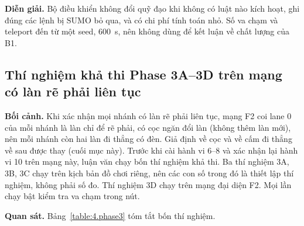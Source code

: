 \documentclass[../main.tex]{subfiles}
\begin{document}
\textbf{Diễn giải.} Bộ điều khiển không đổi quỹ đạo khi không có luật nào kích hoạt, ghi đúng các lệnh bị SUMO bỏ qua, và có chi phí tính toán nhỏ. Số va chạm và teleport đến từ một seed, 600~s, nên không dùng để kết luận về chất lượng của B1.

\subsection{Thí nghiệm khả thi Phase 3A--3D trên mạng có làn rẽ phải liên tục}
\label{subsection:phase3}

\textbf{Bối cảnh.} Khi xác nhận mọi nhánh có làn rẽ phải liên tục, mạng F2 coi lane 0 của mỗi nhánh là làn chỉ để rẽ phải, có cọc ngăn đổi làn (không thêm làn mới), nên mỗi nhánh còn hai làn đi thẳng có đèn. Giả định về cọc và về cấm đi thẳng về sau được thay (cuối mục này). Trước khi cài hành vi 6--8 và xác nhận lại hành vi 10 trên mạng này, luận văn chạy bốn thí nghiệm khả thi. Ba thí nghiệm 3A, 3B, 3C chạy trên kịch bản đồ chơi riêng, nên các con số trong đó là thiết lập thí nghiệm, không phải số đo. Thí nghiệm 3D chạy trên mạng đại diện F2. Mọi lần chạy bật kiểm tra va chạm trong nút.

\textbf{Quan sát.} Bảng~\ref{table:4.phase3} tóm tắt bốn thí nghiệm.
\end{document}
